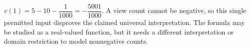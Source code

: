 $v(1)=5-10-\dfrac{1}{1000}=\boxed{-\dfrac{5001}{1000}}$. A view count cannot be negative, so this single permitted input disproves the claimed universal interpretation. The formula may be studied as a real-valued function, but it needs a different interpretation or domain restriction to model nonnegative counts.
